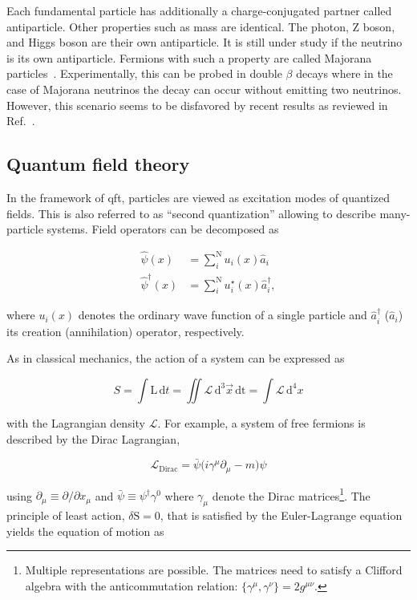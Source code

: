 Each fundamental particle has additionally a charge-conjugated partner called antiparticle. Other properties such as mass are identical. The photon, Z boson, and Higgs boson are their own antiparticle. It is still under study if the neutrino is its own antiparticle. Fermions with such a property are called Majorana particles~\cite{Majorana2006}. Experimentally, this can be probed in double $\beta$ decays where in the case of Majorana neutrinos the decay can occur without emitting two neutrinos. However, this scenario seems to be disfavored by recent results as reviewed in Ref.~\cite{Dell'Oro:2016dbc}.


\subsection{Quantum field theory}

In the framework of \gls{qft}, particles are viewed as excitation modes of quantized fields. This is also referred to as ``second quantization'' allowing to describe many-particle systems. Field operators can be decomposed as

\begin{align}
    \hat{\psi}(x)&=\sum_{i}^{\mathrm{N}}u_{i}(x)\hat{a}_{i} \\
    \hat{\psi}^{\dagger}(x)&=\sum_{i}^{\mathrm{N}}u^{\star}_{i}(x)\hat{a}^{\dagger}_{i},
\end{align}

where $u_{i}(x)$ denotes the ordinary wave function of a single particle and $\hat{a}^{\dagger}_{i}$ ($\hat{a}_{i}$) its creation (annihilation) operator, respectively.

As in classical mechanics, the action of a system can be expressed as

\begin{equation}
S=\int\mathrm{L}\,\mathrm{d}t=\iint\mathcal{L}\,\mathrm{d}^{3}\vec{x}\,\mathrm{dt}=\int\mathcal{L}\,\mathrm{d}^{4}x
\end{equation}

with the Lagrangian density $\mathcal{L}$. For example, a system of free fermions is described by the Dirac Lagrangian,

\begin{equation}
\mathcal{L}_\mathrm{Dirac}=\bar{\psi}\big(i\gamma^\mu\partial_\mu-m\big)\psi
\end{equation}

using $\partial_\mu\equiv\partial/\partial x_\mu$ and $\bar{\psi}\equiv\psi^\dagger\gamma^{0}$ where $\gamma_\mu$ denote the Dirac matrices\footnote{Multiple representations are possible. The matrices need to satisfy a Clifford algebra with the anticommutation relation: $\big\{\gamma^\mu,\gamma^\nu\big\}=2g^{\mu\nu}$.}. The principle of least action, $\delta \mathrm{S}=0$, that is satisfied by the Euler-Lagrange equation yields the equation of motion as

